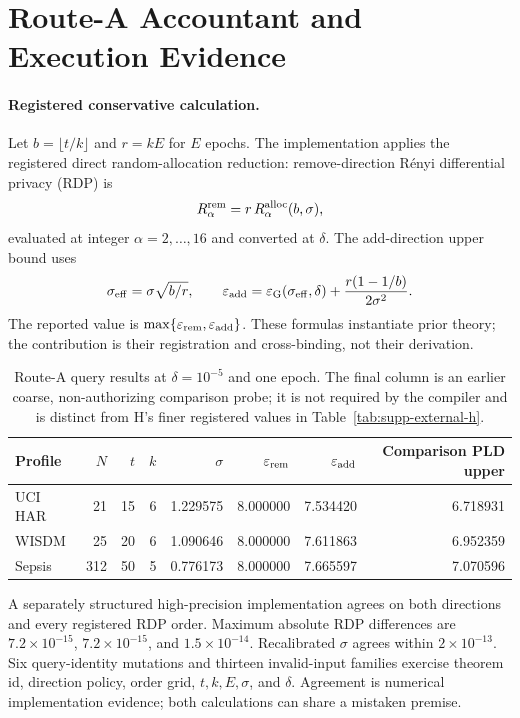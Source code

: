 \documentclass[letterpaper]{article}
\begin{document}
\section{Route-A Accountant and Execution Evidence}

\paragraph{Registered conservative calculation.}
Let $b=\lfloor t/k\rfloor$ and $r=kE$ for $E$ epochs.  The implementation
applies the registered direct random-allocation reduction: remove-direction
R\'enyi differential privacy (RDP) is
\[
 R_\alpha^{\rm rem}=r\,R_\alpha^{\rm alloc}(b,\sigma),
\]
evaluated at integer $\alpha=2,\ldots,16$ and converted at $\delta$.  The
add-direction upper bound uses
\[
 \sigma_{\rm eff}=\sigma\sqrt{b/r},\qquad
 \varepsilon_{\rm add}=
 \varepsilon_{\rm G}(\sigma_{\rm eff},\delta)
 +\frac{r(1-1/b)}{2\sigma^2}.
\]
The reported value is
$\max\{\varepsilon_{\rm rem},\varepsilon_{\rm add}\}$.  These formulas
instantiate prior theory; the contribution is their registration and
cross-binding, not their derivation.

\begin{table}[t]
\centering
\footnotesize
\setlength{\tabcolsep}{5pt}
\begin{tabular}{@{}lrrrrrrr@{}}
\toprule
Profile & $N$ & $t$ & $k$ & $\sigma$ & $\varepsilon_{\rm rem}$ &
$\varepsilon_{\rm add}$ & Comparison PLD upper \\
\midrule
UCI HAR & 21 & 15 & 6 & 1.229575 & 8.000000 & 7.534420 & 6.718931 \\
WISDM & 25 & 20 & 6 & 1.090646 & 8.000000 & 7.611863 & 6.952359 \\
Sepsis & 312 & 50 & 5 & 0.776173 & 8.000000 & 7.665597 & 7.070596 \\
\bottomrule
\end{tabular}
\caption{Route-A query results at $\delta=10^{-5}$ and one epoch.  The final
column is an earlier coarse, non-authorizing comparison probe; it is not
required by the compiler and is distinct from H's finer registered values in
Table~\ref{tab:supp-external-h}.}
\label{tab:supp-a-accountant}
\end{table}

A separately structured high-precision implementation agrees on both
directions and every registered RDP order.  Maximum absolute RDP differences
are $7.2{\times}10^{-15}$, $7.2{\times}10^{-15}$, and
$1.5{\times}10^{-14}$.  Recalibrated $\sigma$ agrees within
$2{\times}10^{-13}$.  Six query-identity mutations and thirteen invalid-input
families exercise theorem id, direction policy, order grid, $t,k,E,\sigma$,
and $\delta$.  Agreement is numerical implementation evidence; both
calculations can share a mistaken premise.
\end{document}
